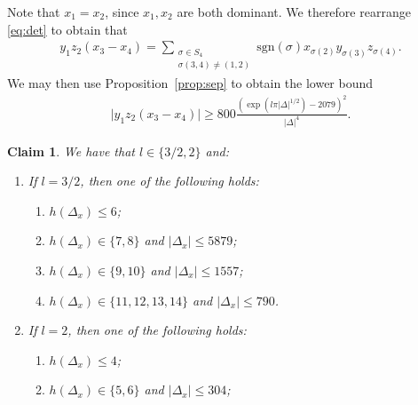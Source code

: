 \documentclass[11pt,a4paper, british]{amsart}
\newtheorem{claim}[thm]{Claim}
\theoremstyle{definition}
\theoremstyle{remark}
\numberwithin{equation}{section}
\begin{document}
Note that $x_1 = x_2$, since $x_1, x_2$ are both dominant. We therefore rearrange \eqref{eq:det} to obtain that
\begin{align}\label{eq:det2}
	y_1 z_2 (x_3 - x_4)  = \sum_{\substack{\sigma \in S_4\\ \sigma(3, 4) \neq (1, 2)}}  \mathrm{sgn}(\sigma) x_{\sigma(2)} y_{\sigma(3)} z_{\sigma(4)}.
\end{align}
We may then use Proposition~\ref{prop:sep} to obtain the lower bound
\begin{align}\label{bd16}
	\lvert y_1 z_2 (x_3 - x_4) \rvert \geq 800 \frac{(\exp(l \pi \lvert \Delta \rvert^{1/2}) - 2079)^2}{\lvert \Delta \rvert^{4}}.
\end{align}

\begin{claim}\label{cl13}
	We have that $l \in \{3/2, 2\}$ and:
	\begin{enumerate}
		\item If $l = 3/2$, then one of the following holds:
		\begin{enumerate}
			\item $h(\Delta_x) \leq 6$;
			\item $h(\Delta_x) \in \{7, 8\}$ and $\lvert \Delta_x \rvert \leq 5879$;
			\item $h(\Delta_x) \in \{9, 10\}$ and $\lvert \Delta_x \rvert \leq 1557$;
			\item $h(\Delta_x) \in \{11, 12, 13, 14\}$ and $\lvert \Delta_x \rvert \leq 790$.
		\end{enumerate}
		\item If $l = 2$, then one of the following holds:
		\begin{enumerate}
			\item $h(\Delta_x) \leq 4$;
			\item $h(\Delta_x) \in \{5, 6\}$ and $\lvert \Delta_x \rvert \leq 304$;
		\end{enumerate}
	\end{enumerate}
\end{claim}
\end{document}
